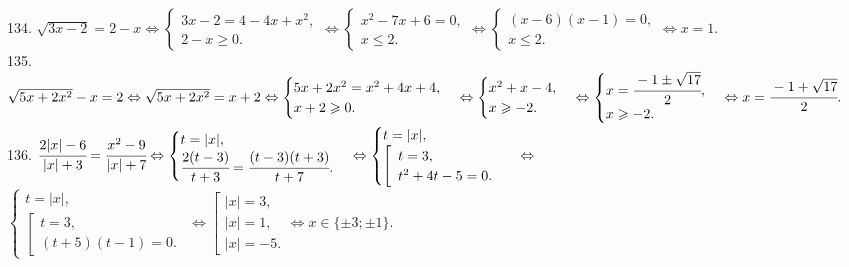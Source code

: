 134. $\sqrt{3x-2}=2-x\Leftrightarrow\begin{cases} 3x-2=4-4x+x^2,\\2-x\geqslant0.\end{cases}\Leftrightarrow
\begin{cases} x^2-7x+6=0,\\x\leqslant2.\end{cases}\Leftrightarrow\begin{cases} (x-6)(x-1)=0,\\x\leqslant2.\end{cases}
\Leftrightarrow x=1.$\\
135. $\sqrt{5x+2x^2}-x=2\Leftrightarrow\sqrt{5x+2x^2}=x+2\Leftrightarrow\begin{cases}5x+2x^2=x^2+4x+4,\\ x+2\geqslant0.\end{cases}
\Leftrightarrow\begin{cases}x^2+x-4,\\ x\geqslant-2.\end{cases}
\Leftrightarrow\begin{cases}x=\cfrac{-1\pm\sqrt{17}}{2},\\ x\geqslant-2.\end{cases}
\Leftrightarrow x=\cfrac{-1+\sqrt{17}}{2}.$\\
136. $\cfrac{2|x|-6}{|x|+3}=\cfrac{x^2-9}{|x|+7}\Leftrightarrow \begin{cases} t=|x|,\\ \cfrac{2(t-3)}{t+3}=\cfrac{(t-3)(t+3)}{t+7}. \end{cases}\Leftrightarrow
\begin{cases} t=|x|,\\ \left[\begin{array}{l} t=3,\\ t^2+4t-5=0.\end{array}\right. \end{cases}\Leftrightarrow$\\$
\begin{cases} t=|x|,\\ \left[\begin{array}{l} t=3,\\ (t+5)(t-1)=0.\end{array}\right. \end{cases}\Leftrightarrow
\left[\begin{array}{l} |x|=3,\\ |x|=1,\\ |x|=-5.\end{array}\right.\Leftrightarrow x\in\{\pm 3; \pm1\}.$\\
